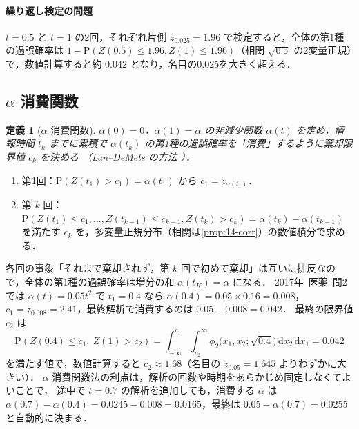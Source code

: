 \documentclass[a4paper,11pt,openany]{ltjsbook}
\newtheorem{teigi}{定義}[chapter]
\newcommand{\kakomon}[2]{\mbox{#1年 医薬 問#2}}
\newcommand{\Prob}{\mathrm{P}}
\newcommand{\dd}{\mathrm{d}}
\begin{document}
\paragraph{繰り返し検定の問題}
$t=0.5$ と $t=1$ の2回，それぞれ片側 $z_{0.025}=1.96$ で検定すると，全体の第1種の過誤確率は
$1-\Prob(Z(0.5)\le1.96,Z(1)\le1.96)$（相関 $\sqrt{0.5}$ の2変量正規）で，数値計算すると約 $0.042$ となり，名目の0.025を大きく超える．

\subsection{\texorpdfstring{$\alpha$}{α} 消費関数}\label{subsec:14-spending}
\begin{teigi}[$\alpha$ 消費関数]\label{def:14-spending}
$\alpha(0)=0$，$\alpha(1)=\alpha$ の非減少関数 $\alpha(t)$ を定め，情報時間 $t_k$ までに累積で $\alpha(t_k)$ の第1種の過誤確率を「消費」するように棄却限界値 $c_k$ を決める
（Lan--DeMets の方法 \cite{landemets1983}）．
\end{teigi}
\begin{enumerate}
\item 第1回：$\Prob(Z(t_1)>c_1)=\alpha(t_1)$ から $c_1=z_{\alpha(t_1)}$．
\item 第 $k$ 回：$\Prob(Z(t_1)\le c_1,\dots,Z(t_{k-1})\le c_{k-1},Z(t_k)>c_k)=\alpha(t_k)-\alpha(t_{k-1})$ を満たす $c_k$ を，多変量正規分布（相関は\cref{prop:14-corr}）の数値積分で求める．
\end{enumerate}
各回の事象「それまで棄却されず，第 $k$ 回で初めて棄却」は互いに排反なので，全体の第1種の過誤確率は増分の和 $\alpha(t_K)=\alpha$ になる．
\kakomon{2017}{2} では $\alpha(t)=0.05t^2$ で $t_1=0.4$ なら $\alpha(0.4)=0.05\times0.16=0.008$，$c_1=z_{0.008}=2.41$，最終解析で消費するのは $0.05-0.008=0.042$．
最終の限界値 $c_2$ は
\[
\Prob(Z(0.4)\le c_1,\ Z(1)>c_2)=\int_{-\infty}^{c_1}\int_{c_2}^{\infty}\phi_2\bigl(x_1,x_2;\sqrt{0.4}\bigr)\,\dd x_2\,\dd x_1=0.042
\]
を満たす値で，数値計算すると $c_2\approx1.68$（名目の $z_{0.05}=1.645$ よりわずかに大きい）．
$\alpha$ 消費関数法の利点は，解析の回数や時期をあらかじめ固定しなくてよいことで，
途中で $t=0.7$ の解析を追加しても，消費する $\alpha$ は $\alpha(0.7)-\alpha(0.4)=0.0245-0.008=0.0165$，最終は $0.05-\alpha(0.7)=0.0255$ と自動的に決まる．
\end{document}
